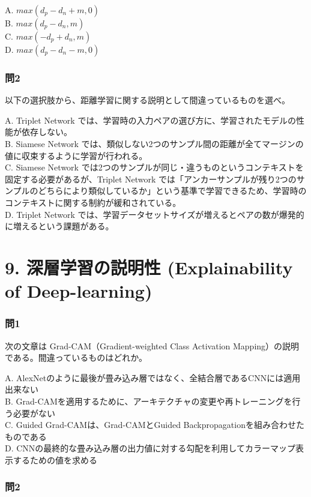 \documentclass[
  letterpaper,
  DIV=11,
  numbers=noendperiod]{scrreprt}
\begin{document}
A. \({max(d_p - d_n + m, 0)}\)\\
B. \({max(d_p - d_n, m)}\)\\
C. \({max(-d_p + d_n, m)}\)\\
D. \({max(d_p - d_n - m, 0)}\)

\subsection{問2}\label{ux554f2-6}

以下の選択肢から、距離学習に関する説明として間違っているものを選べ。

A. Triplet Network
では、学習時の入力ペアの選び方に、学習されたモデルの性能が依存しない。\\
B. Siamese Network
では、類似しない2つのサンプル間の距離が全てマージンの値に収束するように学習が行われる。\\
C. Siamese Network
では2つのサンプルが同じ・違うものというコンテキストを固定する必要があるが、Triplet
Network
では「アンカーサンプルが残り2つのサンプルのどちらにより類似しているか」という基準で学習できるため、学習時のコンテキストに関する制約が緩和されている。\\
D. Triplet Network
では、学習データセットサイズが増えるとペアの数が爆発的に増えるという課題がある。

\chapter{9. 深層学習の説明性 (Explainability of
Deep-learning)}\label{ux6df1ux5c64ux5b66ux7fd2ux306eux8aacux660eux6027-explainability-of-deep-learning}

\subsection{問1}\label{ux554f1-10}

次の文章は Grad-CAM（Gradient-weighted Class Activation
Mapping）の説明である。間違っているものはどれか。

A.
AlexNetのように最後が畳み込み層ではなく、全結合層であるCNNには適用出来ない\\
B.
Grad-CAMを適用するために、アーキテクチャの変更や再トレーニングを行う必要がない\\
C. Guided Grad-CAMは、Grad-CAMとGuided
Backpropagationを組み合わせたものである\\
D.
CNNの最終的な畳み込み層の出力値に対する勾配を利用してカラーマップ表示するための値を求める

\subsection{問2}\label{ux554f2-7}
\end{document}
